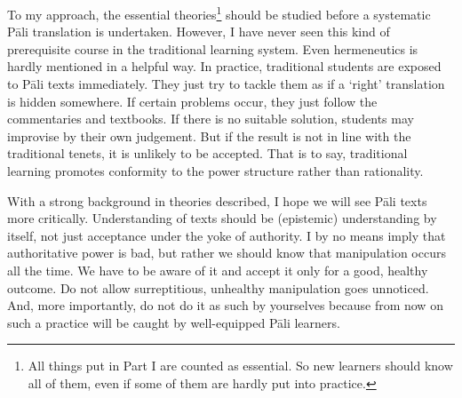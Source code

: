 To my approach, the essential theories\footnote{All things put in Part I are counted as essential. So new learners should know all of them, even if some of them are hardly put into practice.} should be studied before a systematic P\=ali translation is undertaken. However, I have never seen this kind of prerequisite course in the traditional learning system. Even hermeneutics is hardly mentioned in a helpful way. In practice, traditional students are exposed to P\=ali texts immediately. They just try to tackle them as if a `right' translation is hidden somewhere. If certain problems occur, they just follow the commentaries and textbooks. If there is no suitable solution, students may improvise by their own judgement. But if the result is not in line with the traditional tenets, it is unlikely to be accepted. That is to say, traditional learning promotes conformity to the power structure rather than rationality.

With a strong background in theories described, I hope we will see P\=ali texts more critically. Understanding of texts should be (epistemic) understanding by itself, not just acceptance under the yoke of authority. I by no means imply that authoritative power is bad, but rather we should know that manipulation occurs all the time. We have to be aware of it and accept it only for a good, healthy outcome. Do not allow surreptitious, unhealthy manipulation goes unnoticed. And, more importantly, do not do it as such by yourselves because from now on such a practice will be caught by well-equipped P\=ali learners.

